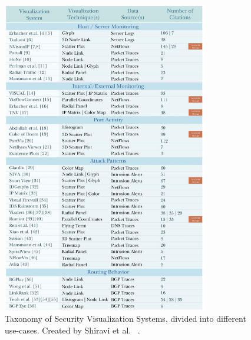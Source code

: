 \begin{figure}[p]
\begin{center}
\includegraphics[width=0.8\textwidth]{images/shiravi2012survey}
\caption{Taxonomy of Security Visualization Systems, divided into different use-cases. Created by Shiravi et al.\ \cite{shiravi2012survey} .} \label{fig: shiravi2012survey}
\end{center}
\end{figure}

%
%

